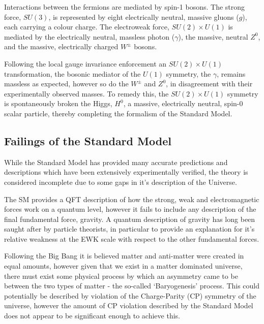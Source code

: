 Interactions between the fermions are mediated by spin-1 bosons. The strong 
force, $SU(3)$, is represented by eight electrically neutral, massive gluons 
($g$), each carrying a colour charge. The electroweak force, $SU(2)\times U(1)$
is
mediated by the electrically neutral, massless photon ($\gamma$), the massive,
neutral $Z^0$, and the massive, electrically charged $W^{\pm}$ bosons.

Following the local gauge invariance enforcement an $SU(2)\times U(1)$
transformation,
the bosonic mediator of the $U(1)$ symmetry, the $\gamma$, remains massless as
expected, however so do the $W^{\pm}$ and $Z^0$, in disagreement with their
experimentally observed masses. To remedy this, the $SU(2)\times U(1)$ symmetry
is
spontaneously broken the Higgs, $H^0$, a massive, electrically neutral, spin-0
scalar particle, thereby completing the formalism of the Standard Model.



\subsection{Failings of the Standard Model}

While the Standard Model has provided many accurate predictions and descriptions
which have been extensively experimentally verified, the theory is considered
incomplete due to some gaps in it's description of the Universe.

The SM provides a QFT description of how the strong, weak and electromagnetic
forces work on a quantum level, however it fails to include any description of
the final fundamental force, gravity. A quantum description of gravity has long
been saught after by particle theorists, in particular to provide an explanation
for it's relative weakness at the EWK scale with respect to the other
fundamental forces.

Following the Big Bang it is believed matter and anti-matter were created in
equal amounts, however given that we exist in a matter dominated universe, there
must exist some physical process by which an asymmetry came to be between the
two types of matter - the so-called `Baryogenesis' process. This could
potentially be described by violation of the Charge-Parity (CP) symmetry of the
universe, however the amount of CP violation described by the Standard Model
does not appear to be significant enough to achieve this.

